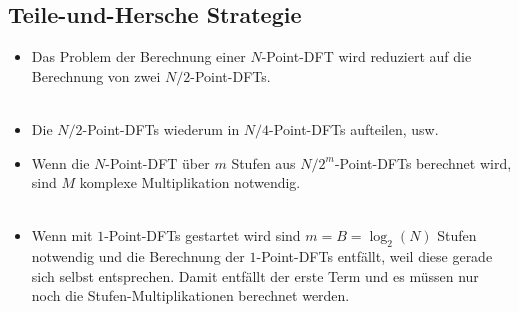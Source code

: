 	\subsection{Teile-und-Hersche Strategie}
		\begin{minipage}{0.7\textwidth}
		\begin{itemize}
		 \item Das Problem der Berechnung einer $N$-Point-DFT wird reduziert auf die Berechnung von zwei $N/2$-Point-DFTs.\\[0.2cm]
		 \\[0.2cm]
		 \item Die $N/2$-Point-DFTs wiederum in $N/4$-Point-DFTs aufteilen, usw.\\[-0.2cm]
		 \item Wenn die $N$-Point-DFT über $m$ Stufen aus $N/2^m$-Point-DFTs berechnet wird, sind $M$ komplexe Multiplikation notwendig.\\[0.2cm]
		 \\[0.25cm]
		 \item Wenn mit $1$-Point-DFTs gestartet wird sind $m = B = \log_2(N)$ Stufen notwendig und die Berechnung der $1$-Point-DFTs entfällt, weil diese gerade sich selbst entsprechen. Damit entfällt der erste Term und es müssen nur noch die Stufen-Multiplikationen berechnet werden.\\[0.2cm]
		\end{itemize}
		\end{minipage}\begin{minipage}{0.05\textwidth}$ $\end{minipage}
